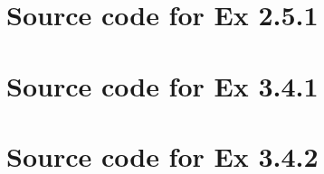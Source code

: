 \documentclass{report}
\begin{document}
\appendix{}

\chapter{Source code for Ex 2.5.1}
\label{cha:source-code-2-5-1}




\chapter{Source code for Ex 3.4.1}
\label{cha:source-code-3-4-1}




\chapter{Source code for Ex 3.4.2}
\label{cha:source-code-3-4-2}


\end{document}
